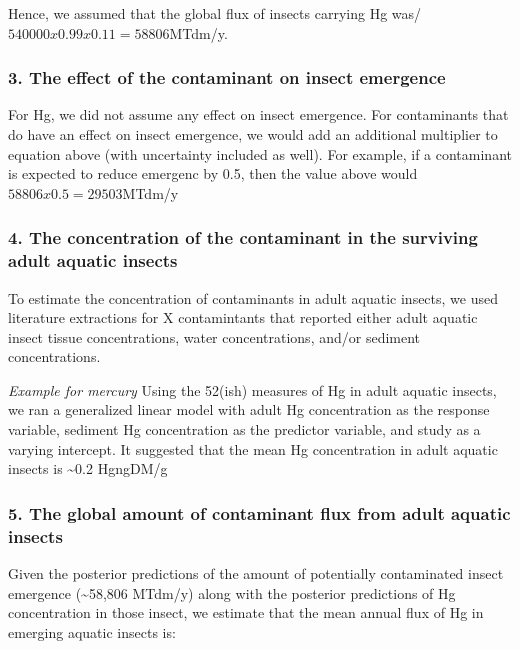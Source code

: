 \documentclass[
]{article}
\begin{document}
Hence, we assumed that the global flux of insects carrying Hg was/
\(540000 x 0.99 x 0.11 = 58806\)MTdm/y.

\hypertarget{the-effect-of-the-contaminant-on-insect-emergence}{%
\subsubsection{3. The effect of the contaminant on insect
emergence}\label{the-effect-of-the-contaminant-on-insect-emergence}}

For Hg, we did not assume any effect on insect emergence. For
contaminants that do have an effect on insect emergence, we would add an
additional multiplier to equation above (with uncertainty included as
well). For example, if a contaminant is expected to reduce emergenc by
0.5, then the value above would \(58806 x 0.5 = 29503\)MTdm/y

\hypertarget{the-concentration-of-the-contaminant-in-the-surviving-adult-aquatic-insects}{%
\subsubsection{4. The concentration of the contaminant in the surviving
adult aquatic
insects}\label{the-concentration-of-the-contaminant-in-the-surviving-adult-aquatic-insects}}

To estimate the concentration of contaminants in adult aquatic insects,
we used literature extractions for X contamintants that reported either
adult aquatic insect tissue concentrations, water concentrations, and/or
sediment concentrations.

\emph{Example for mercury} Using the 52(ish) measures of Hg in adult
aquatic insects, we ran a generalized linear model with adult Hg
concentration as the response variable, sediment Hg concentration as the
predictor variable, and study as a varying intercept. It suggested that
the mean Hg concentration in adult aquatic insects is \textasciitilde0.2
HgngDM/g

\hypertarget{the-global-amount-of-contaminant-flux-from-adult-aquatic-insects}{%
\subsubsection{5. The global amount of contaminant flux from adult
aquatic
insects}\label{the-global-amount-of-contaminant-flux-from-adult-aquatic-insects}}

Given the posterior predictions of the amount of potentially
contaminated insect emergence (\textasciitilde58,806 MTdm/y) along with
the posterior predictions of Hg concentration in those insect, we
estimate that the mean annual flux of Hg in emerging aquatic insects is:
\end{document}
